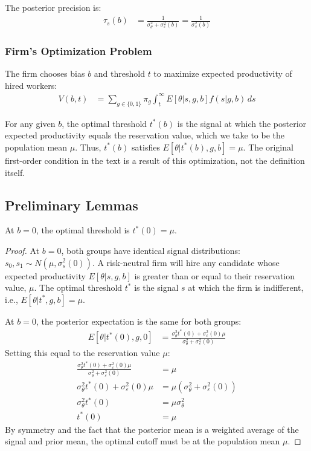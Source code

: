 The posterior precision is:
\begin{align}
\tau_s(b) &= \frac{1}{\sigma_\theta^2 + \sigma_\varepsilon^2(b)} = \frac{1}{\sigma_s^2(b)}
\end{align}

\subsubsection{Firm's Optimization Problem}
The firm chooses bias $b$ and threshold $t$ to maximize expected productivity of hired workers:
\begin{align}
V(b,t) &= \sum_{g \in \{0,1\}} \pi_g \int_t^\infty E[\theta | s, g, b] f(s|g,b) \, ds \label{eq:value_function}
\end{align}

For any given $b$, the optimal threshold $t^*(b)$ is the signal at which the posterior expected productivity equals the reservation value, which we take to be the population mean $\mu$. Thus, $t^*(b)$ satisfies $E[\theta | t^*(b), g, b] = \mu$. The original first-order condition in the text is a result of this optimization, not the definition itself.

\subsection{Preliminary Lemmas}

\begin{lemma}\label{lemma:threshold_symmetry}
At $b = 0$, the optimal threshold is $t^*(0) = \mu$.
\end{lemma}

\begin{proof}
At $b = 0$, both groups have identical signal distributions: $s_0, s_1 \sim N(\mu, \sigma_s^2(0))$. A risk-neutral firm will hire any candidate whose expected productivity $E[\theta|s,g,b]$ is greater than or equal to their reservation value, $\mu$. The optimal threshold $t^*$ is the signal $s$ at which the firm is indifferent, i.e., $E[\theta|t^*, g, b] = \mu$.

At $b=0$, the posterior expectation is the same for both groups:
\begin{align}
E[\theta | t^*(0), g, 0] &= \frac{\sigma_\theta^2 t^*(0) + \sigma_\varepsilon^2(0) \mu}{\sigma_\theta^2 + \sigma_\varepsilon^2(0)}
\end{align}
Setting this equal to the reservation value $\mu$:
\begin{align}
\frac{\sigma_\theta^2 t^*(0) + \sigma_\varepsilon^2(0) \mu}{\sigma_\theta^2 + \sigma_\varepsilon^2(0)} &= \mu \\
\sigma_\theta^2 t^*(0) + \sigma_\varepsilon^2(0) \mu &= \mu(\sigma_\theta^2 + \sigma_\varepsilon^2(0)) \\
\sigma_\theta^2 t^*(0) &= \mu\sigma_\theta^2 \\
t^*(0) &= \mu
\end{align}
By symmetry and the fact that the posterior mean is a weighted average of the signal and prior mean, the optimal cutoff must be at the population mean $\mu$.
\end{proof}

